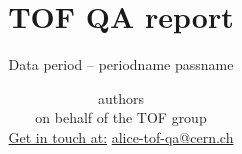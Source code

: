 \title[TOF QA]{ {\Huge TOF QA report} } %
\subtitle{\Large Data period -- {{ periodname }} {{ passname }} } %

\author[ {{ presenter }}]{
  {{ authors }}\\
  on behalf of the TOF group\\
  \href{mailto:alice-tof-qa@cern.ch}{Get in touch at:} \href{mailto:alice-tof-qa@cern.ch}{alice-tof-qa@cern.ch}
} %





